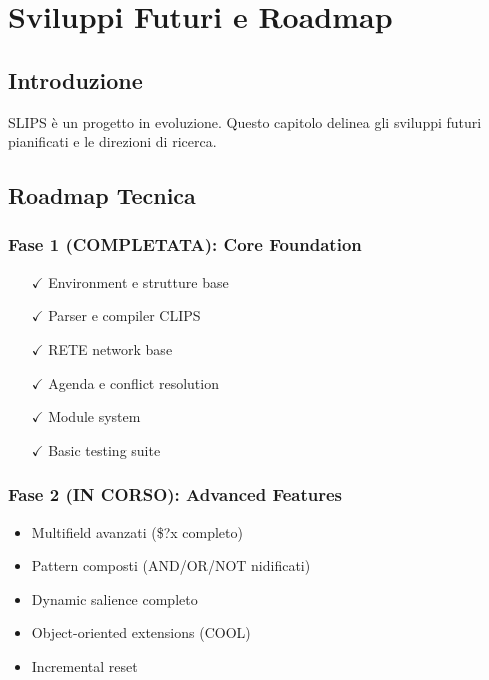 
\chapter{Sviluppi Futuri e Roadmap}
\label{cap:futuro}

\section{Introduzione}

SLIPS è un progetto in evoluzione. Questo capitolo delinea gli sviluppi futuri pianificati e le direzioni di ricerca.

\section{Roadmap Tecnica}

\subsection{Fase 1 (COMPLETATA): Core Foundation}

\begin{successbox}[Achievements]
\begin{itemize}
\item[$\checkmark$] Environment e strutture base
\item[$\checkmark$] Parser e compiler CLIPS
\item[$\checkmark$] RETE network base
\item[$\checkmark$] Agenda e conflict resolution
\item[$\checkmark$] Module system
\item[$\checkmark$] Basic testing suite
\end{itemize}
\end{successbox}

\subsection{Fase 2 (IN CORSO): Advanced Features}

\begin{infobox}
\begin{itemize}
\item Multifield avanzati (\$?x completo)
\item Pattern composti (AND/OR/NOT nidificati)
\item Dynamic salience completo
\item Object-oriented extensions (COOL)
\item Incremental reset
\end{itemize}
\end{infobox}

